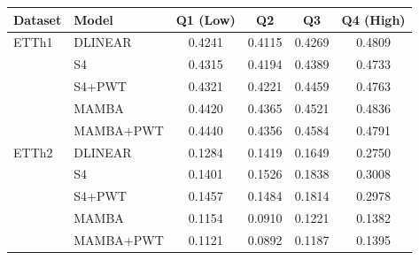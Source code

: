 \begin{tabular}{llcccc}
\toprule
Dataset & Model & Q1 (Low) & Q2 & Q3 & Q4 (High) \\
\midrule
ETTh1 & DLINEAR & 0.4241 & 0.4115 & 0.4269 & 0.4809 \\
 & S4 & 0.4315 & 0.4194 & 0.4389 & 0.4733 \\
 & S4+PWT & 0.4321 & 0.4221 & 0.4459 & 0.4763 \\
 & MAMBA & 0.4420 & 0.4365 & 0.4521 & 0.4836 \\
 & MAMBA+PWT & 0.4440 & 0.4356 & 0.4584 & 0.4791 \\
\midrule
ETTh2 & DLINEAR & 0.1284 & 0.1419 & 0.1649 & 0.2750 \\
 & S4 & 0.1401 & 0.1526 & 0.1838 & 0.3008 \\
 & S4+PWT & 0.1457 & 0.1484 & 0.1814 & 0.2978 \\
 & MAMBA & 0.1154 & 0.0910 & 0.1221 & 0.1382 \\
 & MAMBA+PWT & 0.1121 & 0.0892 & 0.1187 & 0.1395 \\
\bottomrule
\end{tabular}